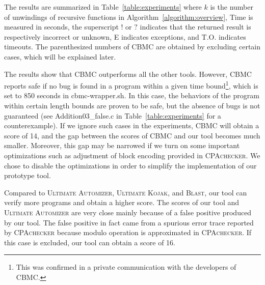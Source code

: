 The results are summarized in
Table~\ref{table:experiments} where $k$ is the number of unwindings of
recursive functions in Algorithm~\ref{algorithm:overview}, Time is
measured in seconds, the superscript $!$ or $?$ indicates that the
returned result is respectively incorrect or unknown, E indicates
exceptions, and T.O. indicates timeouts.
The parenthesized numbers of CBMC are obtained by excluding
certain cases, which will be explained later.

The results show that CBMC outperforms all the other tools.
However, CBMC reports safe if no bug is found in a program within a
given time bound\footnote{This was confirmed in a private
  communication with the developers of CBMC.}, which is set to 850
seconds in cbmc-wrapper.sh.
In this case, the behaviors of the program within certain length
bounds are proven to be safe, but the absence of bugs is not
guaranteed (see Addition03\_false.c in Table~\ref{table:experiments} for
a counterexample).
If we ignore such cases in the experiments, CBMC will obtain a score
of 14, and the gap between the scores of CBMC and our tool becomes
much smaller.
Moreover, this gap may be narrowed if we turn on some important
optimizations such as adjustment of block encoding provided in
\textsc{CPAchecker}.
We chose to disable the optimizations in order to simplify the
implementation of our prototype tool.

Compared to \textsc{Ultimate Automizer}, \textsc{Ultimate Kojak}, and \textsc{Blast},
our tool can verify more programs and obtain a higher score.
The scores of our tool and \textsc{Ultimate Automizer} are very close mainly
because of a false positive produced by our tool.
The false positive in fact came from a spurious error trace reported
by \textsc{CPAchecker} because modulo operation is approximated in
\textsc{CPAchecker}.
If this case is excluded, our tool can obtain a score of 16.





